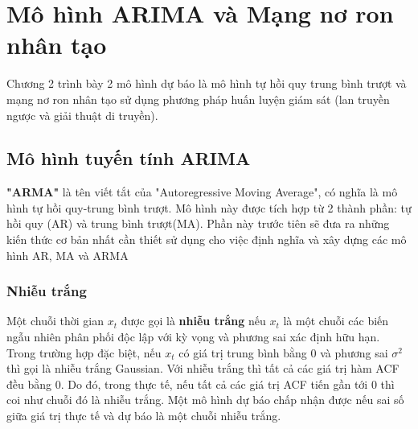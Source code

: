 \chapter{Mô hình ARIMA và Mạng nơ ron nhân tạo}
\ifpdf
    \graphicspath{{02_ARIMA/figures/PNG/}{02_ARIMA/figures/PDF/}{02_ARIMA/figures/}}
\else
    \graphicspath{{02_ARIMA/figures/EPS/}{02_ARIMA/figures/}}
\fi

Chương 2 trình bày 2 mô hình dự báo là mô hình tự hồi quy trung bình trượt và mạng nơ ron nhân tạo sử dụng phương pháp huấn luyện giám sát (lan truyền ngược và giải thuật di truyền).
\section{Mô hình tuyến tính ARIMA}

\textbf{"ARMA"} là tên viết tắt của "Autoregressive Moving Average", có nghĩa là mô hình tự hồi quy-trung bình trượt. Mô hình này được tích hợp từ 2 thành phần: tự hồi quy (AR) và trung bình trượt(MA). Phần này trước tiên sẽ đưa ra những kiến thức cơ bản nhất cần thiết sử dụng cho việc định nghĩa và xây dựng các mô hình AR, MA và ARMA
\subsection{Nhiễu trắng}
Một chuỗi thời gian $x_t$ được gọi là \textbf{nhiễu trắng} nếu $x_t$ là một chuỗi các biến ngẫu nhiên phân phối độc lập với kỳ vọng và phương sai xác định hữu hạn. Trong trường hợp đặc biệt, nếu $x_t$ có giá trị trung bình bằng $0$ và phương sai $\sigma^2$ thì gọi là nhiễu trắng Gaussian. Với nhiễu trắng thì tất cả các giá trị hàm ACF đều bằng $0$. Do đó, trong thực tế, nếu tất cả các giá trị ACF tiến gần tới $0$ thì coi như chuỗi đó là nhiễu trắng. Một mô hình dự báo chấp nhận được nếu sai số giữa giá trị thực tế và dự báo là một chuỗi nhiễu trắng. 


